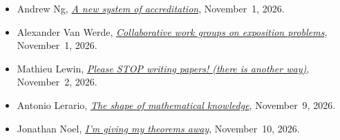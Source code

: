 \begin{itemize}
    October~30, 2026.
  \item[\hypertarget{pp:P10}{[P10]}] Andrew Ng,
    \href{https://proofsandprompts.com/2026/11/01/a-new-system-of-accreditation/}{\emph{A new system of accreditation}},
    November~1, 2026.
  \item[\hypertarget{pp:P11}{[P11]}] Alexander Van Werde,
    \href{https://proofsandprompts.com/2026/11/01/collaborative-work-groups-on-exposition-problems/}{\emph{Collaborative work groups on exposition problems}},
    November~1, 2026.
  \item[\hypertarget{pp:P12}{[P12]}] Mathieu Lewin,
    \href{https://proofsandprompts.com/2026/11/02/please-stop-writing-papers-there-is-another-way/}{\emph{Please STOP writing papers! (there is another way)}},
    November~2, 2026.
  \item[\hypertarget{pp:P13}{[P13]}] Antonio Lerario,
    \href{https://proofsandprompts.com/2026/11/09/the-shape-of-mathematical-knowledge/}{\emph{The shape of mathematical knowledge}},
    November~9, 2026.
  \item[\hypertarget{pp:P14}{[P14]}] Jonathan Noel,
    \href{https://proofsandprompts.com/2026/11/10/im-giving-my-theorems-away/}{\emph{I'm giving my theorems away}},
    November~10, 2026.
\end{itemize}
